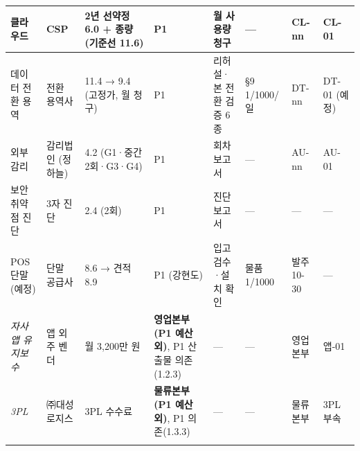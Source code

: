 \documentclass[10pt,a4paper]{article}
\begin{document}
{\begin{tabularx}{\linewidth}{|L{26mm}|L{26mm}|L{38mm}|L{30mm}|Y|L{34mm}|L{36mm}|L{18mm}|}
클라우드 & CSP & 2년 선약정 6.0 + 종량 (기준선 11.6) & P1 & 월 사용량 청구 & — & CL-nn & CL-01 \\ \hline
데이터 전환 용역 & 전환 용역사 & 11.4 → 9.4 (고정가, 월 청구) & P1 & 리허설·본 전환 검증 6종 & §9 1/1000/일 & DT-nn & DT-01 (예정) \\ \hline
외부 감리 & 감리법인 (정하늘) & 4.2 (G1·중간 2회·G3·G4) & P1 & 회차 보고서 & — & AU-nn & AU-01 \\ \hline
보안취약점 진단 & 3자 진단 & 2.4 (2회) & P1 & 진단 보고서 & — & — & — \\ \hline
POS 단말 (예정) & 단말 공급사 & 8.6 → 견적 8.9 & P1 (강현도) & 입고 검수·설치 확인 & 물품 1/1000 & 발주 10-30 & — \\ \hline
\emph{자사앱 유지보수} & 앱 외주 벤더 & 월 3,200만 원 & \textbf{영업본부 (P1 예산 외)}, P1 산출물 의존(1.2.3) & — & — & 영업본부 & 앱-01 \\ \hline
\emph{3PL} & ㈜대성로지스 & 3PL 수수료 & \textbf{물류본부 (P1 예산 외)}, P1 의존(1.3.3) & — & — & 물류본부 & 3PL 부속 \\ \hline
\fi
\end{tabularx}}
\end{document}
